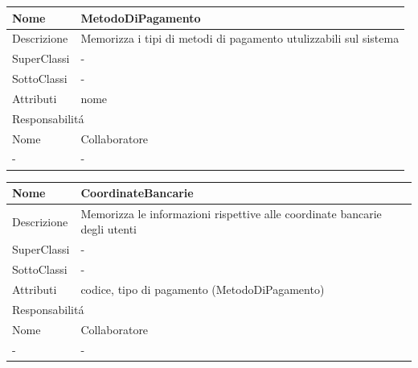 \begin{center} %
    \begin{longtable}{ |p{3cm}|p{3cm}|p{3cm}|p{3cm}| }
        \hline
        Nome & \multicolumn{3}{|p{9cm}|}{MetodoDiPagamento} \\\hline
        Descrizione & \multicolumn{3}{|p{9cm}|}{Memorizza i tipi di metodi di pagamento utulizzabili sul sistema} \\\hline
        SuperClassi & \multicolumn{3}{|p{9cm}|}{-} \\\hline
        SottoClassi & \multicolumn{3}{|p{9cm}|}{-} \\\hline
        Attributi & \multicolumn{3}{|p{9cm}|}{nome} \\\hline
        \multicolumn{4}{|p{12cm}|}{Responsabilit\'a} \\\hline %
        \multicolumn{2}{|p{6cm}|}{Nome} & \multicolumn{2}{|p{6cm}|}{Collaboratore} \\\hline %
        \multicolumn{2}{|p{6cm}|}{-} & \multicolumn{2}{|p{6cm}|}{-} \\\hline
    \end{longtable}
\end{center}

\begin{center} %
    \begin{longtable}{ |p{3cm}|p{3cm}|p{3cm}|p{3cm}| }
        \hline
        Nome & \multicolumn{3}{|p{9cm}|}{CoordinateBancarie} \\\hline
        Descrizione & \multicolumn{3}{|p{9cm}|}{Memorizza le informazioni rispettive alle coordinate bancarie degli utenti} \\\hline
        SuperClassi & \multicolumn{3}{|p{9cm}|}{-} \\\hline
        SottoClassi & \multicolumn{3}{|p{9cm}|}{-} \\\hline
        Attributi & \multicolumn{3}{|p{9cm}|}{codice, tipo di pagamento (MetodoDiPagamento)} \\\hline
        \multicolumn{4}{|p{12cm}|}{Responsabilit\'a} \\\hline %
        \multicolumn{2}{|p{6cm}|}{Nome} & \multicolumn{2}{|p{6cm}|}{Collaboratore} \\\hline %
        \multicolumn{2}{|p{6cm}|}{-} & \multicolumn{2}{|p{6cm}|}{-} \\\hline
    \end{longtable}
\end{center}

